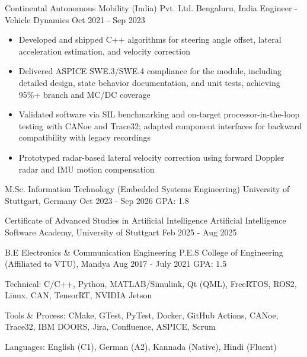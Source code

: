 \documentclass{bmsnkresume}
\begin{document}
\experience
  {Continental Autonomous Mobility (India) Pvt. Ltd.}
  {Bengaluru, India}
  {Engineer - Vehicle Dynamics}
  {Oct 2021 - Sep 2023}
\begin{itemize}
  \item Developed and shipped C++ algorithms for steering angle offset, lateral acceleration estimation, and velocity correction
  \item Delivered ASPICE SWE.3/SWE.4 compliance for the module, including detailed design, state behavior documentation, and unit tests, achieving 95\%+ branch and MC/DC coverage
  \item Validated software via SIL benchmarking and on-target processor-in-the-loop testing with CANoe and Trace32; adapted component interfaces for backward compatibility with legacy recordings
  \item Prototyped radar-based lateral velocity correction using forward Doppler radar and IMU motion compensation
\end{itemize}
\vspace{-0.6em}

  \educationentry
    {M.Sc. Information Technology (Embedded Systems Engineering)}
    {University of Stuttgart, Germany}
    {Oct 2023 - Sep 2026}
    {GPA: 1.8}
    {}

  \educationentry
    {Certificate of Advanced Studies in Artificial Intelligence}
    {Artificial Intelligence Software Academy, University of Stuttgart}
    {Feb 2025 - Aug 2025}
    {}
    {}

  \educationentry
    {B.E Electronics \& Communication Engineering}
    {P.E.S College of Engineering (Affiliated to VTU), Mandya}
    {Aug 2017 - July 2021}
    {GPA: 1.5}
    {}

\vspace{-0.5em}
\vspace{0.2em}

{\color{darktext} Technical: C/C++, Python, MATLAB/Simulink, Qt (QML), FreeRTOS, ROS2, Linux, CAN, TensorRT, NVIDIA Jetson\par}
{\color{darktext} Tools \& Process: CMake, GTest, PyTest, Docker, GitHub Actions, CANoe, Trace32, IBM DOORS, Jira, Confluence, ASPICE, Scrum\par}
{\color{darktext} Languages: English (C1), German (A2), Kannada (Native), Hindi (Fluent)\par}
\end{document}
